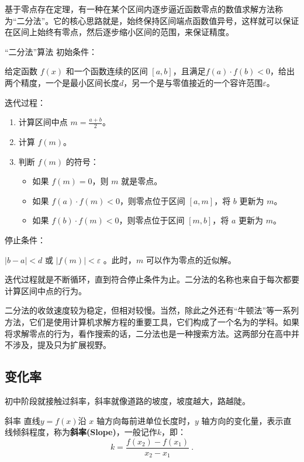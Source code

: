 基于零点存在定理，有一种在某个区间内逐步逼近函数零点的数值求解方法称为“二分法”。它的核心思路就是，始终保持区间端点函数值异号，这样就可以保证在区间上始终有零点，然后逐步缩小区间的范围，来保证精度。

\begin{theorem}{“二分法”算法}
初始条件：

给定函数 $f(x)$ 和一个函数连续的区间 $[a, b]$，且满足$f(a) \cdot f(b) < 0$，给出两个精度，一个是最小区间长度$d$，另一个是与零值接近的一个容许范围$\varepsilon$。

迭代过程：

\begin{enumerate}
\item 计算区间中点 $m = \frac{a + b}{2}$。
\item 计算 $f(m)$。
\item 判断 $f(m)$ 的符号：
\begin{itemize}
\item 如果 $f(m) = 0$，则 $m$ 就是零点。
\item 如果 $f(a) \cdot f(m) < 0$，则零点位于区间 $[a, m]$，将 $b$ 更新为 $m$。
\item 如果 $f(b) \cdot f(m) < 0$，则零点位于区间 $[m, b]$，将 $a$ 更新为 $m$。
\end{itemize}
\end{enumerate}

停止条件：

$|b - a|<d$ 或 $|f(m)|<\varepsilon$ 。此时，$m$ 可以作为零点的近似解。
\end{theorem}

迭代过程就是不断循环，直到符合停止条件为止。二分法的名称也来自于每次都要计算区间中点的行为。

二分法的收敛速度较为稳定，但相对较慢。当然，除此之外还有“牛顿法”等一系列方法，它们是使用计算机求解方程的重要工具，它们构成了一个名为的学科。如果将求解零点的行为，看作搜索的话，二分法也是一种搜索方法。这两部分在高中并不涉及，提及只为扩展视野。

\subsection{变化率}\label{sub_HsFunC_4}

初中阶段就接触过斜率，斜率就像道路的坡度，坡度越大，路越陡。

\begin{definition}{斜率}
直线$y=f(x)$沿 $x$ 轴方向每前进单位长度时，$y$ 轴方向的变化量，表示直线倾斜程度，称为\textbf{斜率(Slope)}，一般记作$k$，即：
\begin{equation}
k = \frac{f(x_2)-f(x_1)}{x_2-x_1}~.
\end{equation}
\end{definition}

